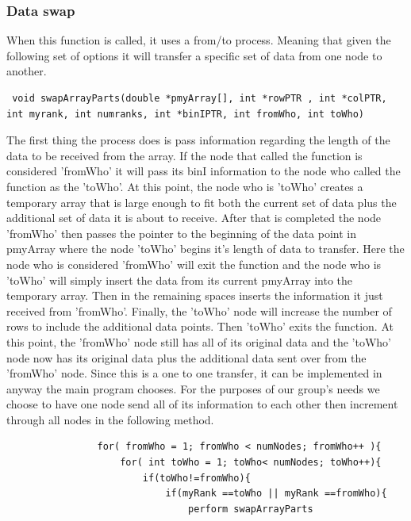 \documentclass{article}
\begin{document}
\subsubsection{Data swap}
When this function is called, it uses a from/to process. Meaning that given the following set of options it will transfer a specific set of data from one node to another. 
\begin{lstlisting}
 void swapArrayParts(double *pmyArray[], int *rowPTR , int *colPTR, int myrank, int numranks, int *binIPTR, int fromWho, int toWho)        
\end{lstlisting}
The first thing the process does is pass information regarding the length of the data to be received from the array. If the node that called the function is considered 'fromWho' it will pass its binI information to the node who called the function as the 'toWho'. At this point, the node who is 'toWho' creates a temporary array that is large enough to fit both the current set of data plus the additional set of data it is about to receive. After that is completed the node 'fromWho' then passes the pointer to the beginning of the data point in pmyArray where the node 'toWho' begins it's length of data to transfer. Here the node who is considered 'fromWho' will exit the function and the node who is 'toWho' will simply insert the data from its current pmyArray into the temporary array. Then in the remaining spaces inserts the information it just received from 'fromWho'. Finally, the 'toWho' node will increase the number of rows to include the additional data points. Then 'toWho' exits the function. At this point, the 'fromWho' node still has all of its original data and the 'toWho' node now has its original data plus the additional data sent over from the 'fromWho' node. Since this is a one to one transfer, it can be implemented in anyway the main program chooses. For the purposes of our group's needs we choose to have one node send all of its information to each other then increment through all nodes in the following method.
\begin{lstlisting}
                for( fromWho = 1; fromWho < numNodes; fromWho++ ){
                    for( int toWho = 1; toWho< numNodes; toWho++){
                        if(toWho!=fromWho){
                            if(myRank ==toWho || myRank ==fromWho){
                                perform swapArrayParts
\end{lstlisting}
\end{document}
